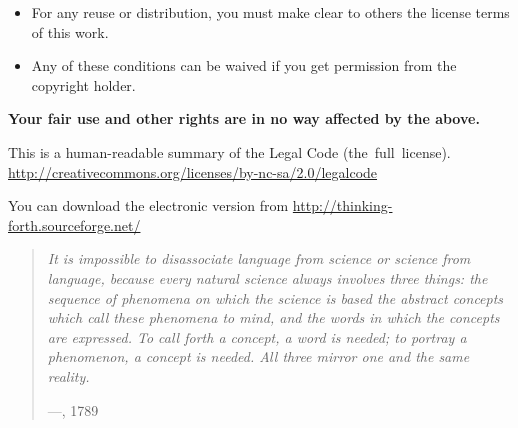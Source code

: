 \documentclass[10pt,american,pdftex]{book}
\begin{document}
\begin{itemize}
\item For any reuse or distribution, you must make clear to others the
license terms of this work.
 
\item Any of these conditions can be waived if you get permission from the copyright holder.
\end{itemize}

\begin{center}
\textbf{Your fair use and other rights are in no way affected by the above.}

\medskip
This is a human-readable summary of the Legal Code
{\def\UrlLeft#1\UrlRight{(the\ full\ license).}
\url{http://creativecommons.org/licenses/by-nc-sa/2.0/legalcode}}

\bigskip
\vfill
You can download the electronic version from
\url{http://thinking-forth.sourceforge.net/}


\end{center}


\cleardoublepage

\vspace*{100pt}
\begin{quotation}
\noindent\emph{%
It is impossible to disassociate language from science or science from
language, because every natural science always involves three things:
the sequence of phenomena on which the science is based the abstract
concepts which call these phenomena to mind, and the words in which
the concepts are expressed. To call forth a concept, a word is needed;
to portray a phenomenon, a concept is needed. All three mirror one and
the same reality.}

\begin{flushright}
---, 1789
\end{flushright}
\end{quotation}


\cleardoublepage
\pagestyle{headings}
\tableofcontents
\makeatletter
\renewcommand\numberline[1]{\hb@xt@\@tempdima{#1\hfil}}
\makeatother
\setcounter{tocdepth}{4}
\sectionlabelfalse


\vfill\pagebreak
\sectionlabeltrue
\setcounter{sectionlr}{4}
\setcounter{page}{1}














\cleardoublepage
\printindex
\end{document}
